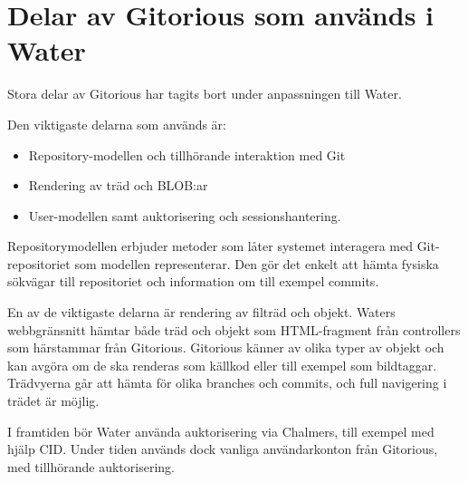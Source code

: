 \section{Delar av Gitorious som används i Water}
Stora delar av Gitorious har tagits bort under anpassningen till Water.

Den viktigaste delarna som används är:
\begin{itemize}
  \item Repository-modellen och tillhörande interaktion med Git
  \item Rendering av träd och BLOB:ar
  \item User-modellen samt auktorisering och sessionshantering.
\end{itemize}

Repositorymodellen erbjuder metoder som låter systemet interagera med Git-repositoriet som modellen representerar. Den gör det enkelt att hämta fysiska sökvägar till repositoriet och information om till exempel commits.

En av de viktigaste delarna är rendering av filträd och objekt. Waters webbgränsnitt hämtar både träd och objekt som HTML-fragment från controllers som härstammar från Gitorious. 
Gitorious känner av olika typer av objekt och kan avgöra om de ska renderas som källkod eller till exempel som bildtaggar. Trädvyerna går att hämta för olika branches och commits, och full navigering i trädet är möjlig.

I framtiden bör Water använda auktorisering via Chalmers, till exempel med hjälp CID. Under tiden används dock vanliga användarkonton från Gitorious, med tillhörande auktorisering.